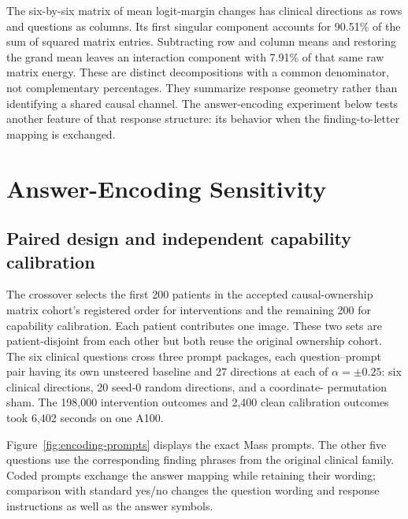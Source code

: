 The six-by-six matrix of mean logit-margin changes has clinical directions
as rows and questions as columns. Its first singular component accounts
for 90.51\% of the sum of squared matrix entries. Subtracting row and column
means and restoring the grand mean leaves an interaction component with
7.91\% of that same raw matrix energy. These are distinct decompositions
with a common denominator, not complementary percentages. They summarize
response geometry rather than identifying a shared causal channel. The
answer-encoding experiment below tests another feature of that response
structure: its behavior when the finding-to-letter mapping is exchanged.

\FloatBarrier

\section{Answer-Encoding Sensitivity}
\label{app:encoding}

\subsection{Paired design and independent capability calibration}

The crossover selects the first 200 patients in the accepted causal-ownership
matrix cohort's registered order for interventions and the remaining 200 for
capability calibration. Each patient contributes one image. These two
sets are patient-disjoint from each other but both reuse the original
ownership cohort. The six clinical questions cross three prompt packages,
each question--prompt pair having its own unsteered baseline and
27 directions at each of $\alpha=\pm0.25$:
six clinical directions, 20 seed-0 random directions, and a coordinate-
permutation sham. The 198,000 intervention outcomes and 2,400 clean
calibration outcomes took 6,402 seconds on one A100.

Figure~\ref{fig:encoding-prompts} displays the exact Mass prompts. The other
five questions use the corresponding finding phrases from the original
clinical family. Coded prompts exchange the answer mapping while retaining
their wording; comparison with standard yes/no changes the question wording
and response instructions as well as the answer symbols.

